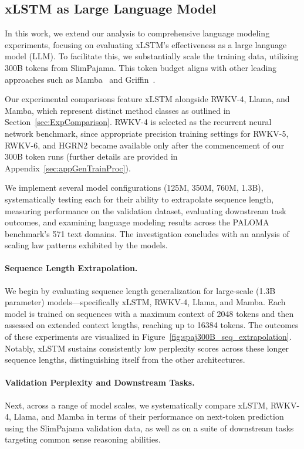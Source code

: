 \subsection{xLSTM as Large Language Model}
\label{sec:ExpLanguage}

In this work, we extend our analysis to comprehensive language modeling experiments, focusing on evaluating xLSTM’s effectiveness as a large language model (LLM). To facilitate this, we substantially scale the training data, utilizing 300B tokens from SlimPajama. This token budget aligns with other leading approaches such as Mamba~\citep{Gu:24arxiv} and Griffin~\citep{De:24arxiv}.

Our experimental comparisons feature xLSTM alongside RWKV-4, Llama, and Mamba, which represent distinct method classes as outlined in Section~\ref{sec:ExpComparison}. RWKV-4 is selected as the recurrent neural network benchmark, since appropriate precision training settings for RWKV-5, RWKV-6, and HGRN2 became available only after the commencement of our 300B token runs (further details are provided in Appendix~\ref{sec:appGenTrainProc}).

We implement several model configurations (125M, 350M, 760M, 1.3B), systematically testing each for their ability to extrapolate sequence length, measuring performance on the validation dataset, evaluating downstream task outcomes, and examining language modeling results across the PALOMA benchmark’s 571 text domains. The investigation concludes with an analysis of scaling law patterns exhibited by the models.

\paragraph{Sequence Length Extrapolation.}
\label{sec:spaj300B_ctx_extrapolation}
We begin by evaluating sequence length generalization for large-scale (1.3B parameter) models—specifically xLSTM, RWKV-4, Llama, and Mamba. Each model is trained on sequences with a maximum context of 2048 tokens and then assessed on extended context lengths, reaching up to 16384 tokens. The outcomes of these experiments are visualized in Figure~\ref{fig:spaj300B_seq_extrapolation}. Notably, xLSTM sustains consistently low perplexity scores across these longer sequence lengths, distinguishing itself from the other architectures.

\paragraph{Validation Perplexity and Downstream Tasks.}
\label{sec:spaj_downstream_eval}
Next, across a range of model scales, we systematically compare xLSTM, RWKV-4, Llama, and Mamba in terms of their performance on next-token prediction using the SlimPajama validation data, as well as on a suite of downstream tasks targeting common sense reasoning abilities.


